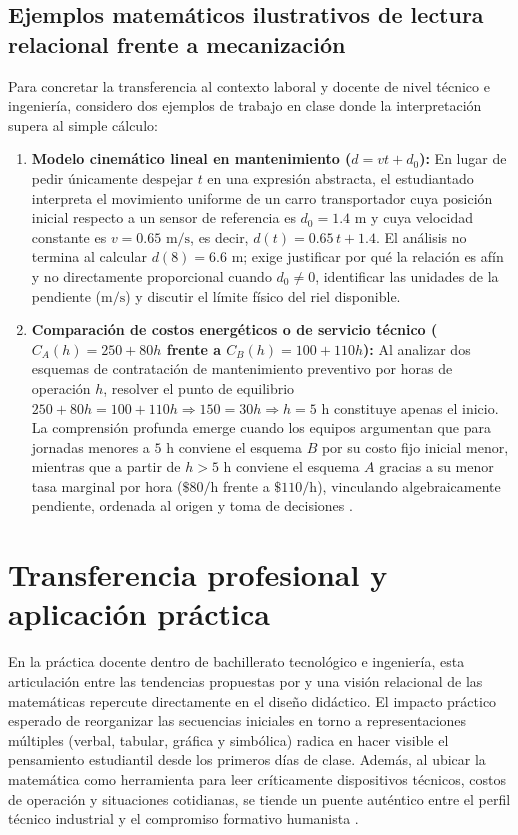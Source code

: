 \documentclass[spanish,letterpaper,oneside]{article}
\begin{document}
\subsection*{Ejemplos matemáticos ilustrativos de lectura relacional frente a mecanización}
Para concretar la transferencia al contexto laboral y docente de nivel técnico e ingeniería, considero dos ejemplos de trabajo en clase donde la interpretación supera al simple cálculo:
\begin{enumerate}
  \item \textbf{Modelo cinemático lineal en mantenimiento ($d = v t + d_0$):} En lugar de pedir únicamente despejar $t$ en una expresión abstracta, el estudiantado interpreta el movimiento uniforme de un carro transportador cuya posición inicial respecto a un sensor de referencia es $d_0 = 1.4\text{ m}$ y cuya velocidad constante es $v = 0.65\text{ m/s}$, es decir, $d(t) = 0.65\,t + 1.4$. El análisis no termina al calcular $d(8) = 6.6\text{ m}$; exige justificar por qué la relación es afín y no directamente proporcional cuando $d_0 \neq 0$, identificar las unidades de la pendiente ($\text{m/s}$) y discutir el límite físico del riel disponible.
  \item \textbf{Comparación de costos energéticos o de servicio técnico ($C_A(h) = 250 + 80h$ frente a $C_B(h) = 100 + 110h$):} Al analizar dos esquemas de contratación de mantenimiento preventivo por horas de operación $h$, resolver el punto de equilibrio $250 + 80h = 100 + 110h \Rightarrow 150 = 30h \Rightarrow h = 5\text{ h}$ constituye apenas el inicio. La comprensión profunda emerge cuando los equipos argumentan que para jornadas menores a $5\text{ h}$ conviene el esquema $B$ por su costo fijo inicial menor, mientras que a partir de $h > 5\text{ h}$ conviene el esquema $A$ gracias a su menor tasa marginal por hora ($\text{\$80/h}$ frente a $\text{\$110/h}$), vinculando algebraicamente pendiente, ordenada al origen y toma de decisiones \citep{star2015algebra}.
\end{enumerate}

\section{Transferencia profesional y aplicación práctica}
En la práctica docente dentro de bachillerato tecnológico e ingeniería, esta articulación entre las tendencias propuestas por \citet{scott2015futuro} y una visión relacional de las matemáticas repercute directamente en el diseño didáctico. El impacto práctico esperado de reorganizar las secuencias iniciales en torno a representaciones múltiples (verbal, tabular, gráfica y simbólica) radica en hacer visible el pensamiento estudiantil desde los primeros días de clase. Además, al ubicar la matemática como herramienta para leer críticamente dispositivos técnicos, costos de operación y situaciones cotidianas, se tiende un puente auténtico entre el perfil técnico industrial y el compromiso formativo humanista \citep{delors1996educacion,pimienta2012estrategias}.
\end{document}
